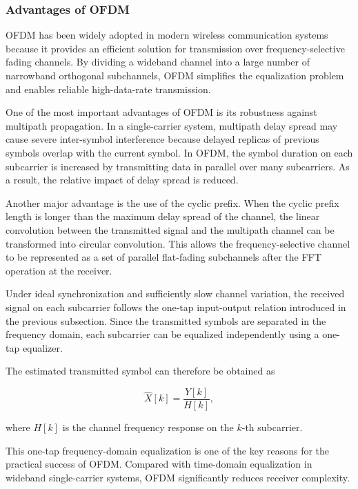 \subsubsection{Advantages of OFDM}

OFDM has been widely adopted in modern wireless communication systems because it provides an efficient solution for transmission over frequency-selective fading channels. By dividing a wideband channel into a large number of narrowband orthogonal subchannels, OFDM simplifies the equalization problem and enables reliable high-data-rate transmission.

One of the most important advantages of OFDM is its robustness against multipath propagation. In a single-carrier system, multipath delay spread may cause severe inter-symbol interference because delayed replicas of previous symbols overlap with the current symbol. In OFDM, the symbol duration on each subcarrier is increased by transmitting data in parallel over many subcarriers. As a result, the relative impact of delay spread is reduced.

Another major advantage is the use of the cyclic prefix. When the cyclic prefix length is longer than the maximum delay spread of the channel, the linear convolution between the transmitted signal and the multipath channel can be transformed into circular convolution. This allows the frequency-selective channel to be represented as a set of parallel flat-fading subchannels after the FFT operation at the receiver.

Under ideal synchronization and sufficiently slow channel variation, the received signal on each subcarrier follows the one-tap input-output relation introduced in the previous subsection. Since the transmitted symbols are separated in the frequency domain, each subcarrier can be equalized independently using a one-tap equalizer.

The estimated transmitted symbol can therefore be obtained as

\begin{equation}
\hat{X}[k]=\frac{Y[k]}{H[k]},
\end{equation}

where \(H[k]\) is the channel frequency response on the \(k\)-th subcarrier.

This one-tap frequency-domain equalization is one of the key reasons for the practical success of OFDM. Compared with time-domain equalization in wideband single-carrier systems, OFDM significantly reduces receiver complexity.

